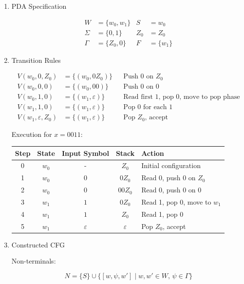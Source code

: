 \documentclass[12pt,a4paper,openany]{article}
\begin{document}
\begin{enumerate}

\item PDA Specification

\begin{align*}
W &= \{w_0, w_1\} & S &= w_0 \\
\Sigma &= \{0, 1\} & Z_0 &= Z_0 \\
\Gamma &= \{Z_0, 0\} & F &= \{w_1\}
\end{align*}

\item Transition Rules

\begin{align*}
V(w_0, 0, Z_0) &= \{(w_0, 0Z_0)\} && \text{Push 0 on } Z_0 \\
V(w_0, 0, 0)   &= \{(w_0, 00)\}   && \text{Push 0 on 0} \\
V(w_0, 1, 0)   &= \{(w_1, \varepsilon)\} && \text{Read first 1, pop 0, move to pop phase} \\
V(w_1, 1, 0)   &= \{(w_1, \varepsilon)\} && \text{Pop 0 for each 1} \\
V(w_1, \varepsilon, Z_0) &= \{(w_1, \varepsilon)\} && \text{Pop } Z_0\text{, accept}
\end{align*}

Execution for $x = 0011$:

\begin{table}[h]
\centering
\begin{tabular}{|c|c|c|c|l|}
\hline
\textbf{Step} & \textbf{State} & \textbf{Input Symbol} & \textbf{Stack} & \textbf{Action} \\
\hline
0 & $w_0$ & - & $Z_0$ & Initial configuration \\
\hline
1 & $w_0$ & $0$ & $0Z_0$ & Read 0, push 0 on $Z_0$ \\
\hline
2 & $w_0$ & $0$ & $00Z_0$ & Read 0, push 0 on 0 \\
\hline
3 & $w_1$ & $1$ & $0Z_0$ & Read 1, pop 0, move to $w_1$ \\
\hline
4 & $w_1$ & $1$ & $Z_0$ & Read 1, pop 0 \\
\hline
5 & $w_1$ & $\varepsilon$ & $\varepsilon$ & Pop $Z_0$, accept \\
\hline
\end{tabular}
\end{table}


\item Constructed CFG 

Non-terminals:

\[
N = \{S\} \cup \{[w, \psi, w'] \mid w, w' \in W,\, \psi \in \Gamma\}
\]


\end{enumerate}
\end{document}
